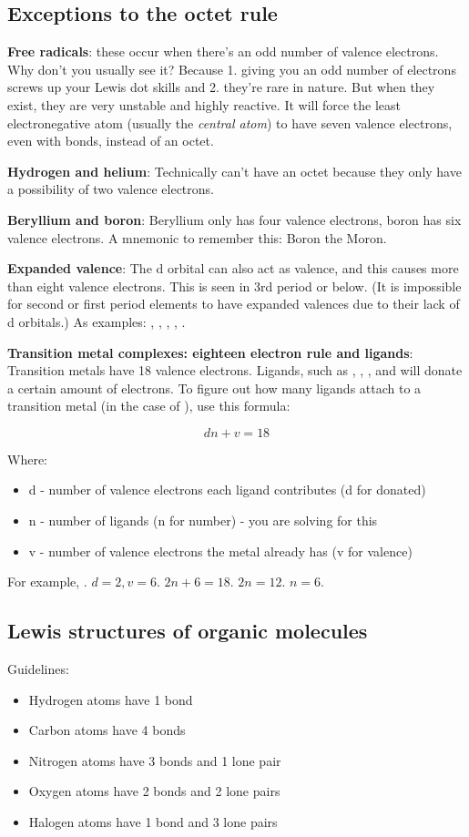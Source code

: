 \documentclass[letterpaper, 12pt]{article}
\begin{document}
	\subsection{Exceptions to the octet rule}
	\textbf{Free radicals}: these occur when there's an odd number of valence electrons. Why don't you usually see it? Because 1. giving you an odd number of electrons screws up your Lewis dot skills and 2. they're rare in nature. But when they exist, they are very unstable and highly reactive. It will force the least electronegative atom (usually the \textit{central atom}) to have seven valence electrons, even with bonds, instead of an octet.
	
	\textbf{Hydrogen and helium}: Technically can't have an octet because they only have a possibility of two valence electrons.
	
	\textbf{Beryllium and boron}: Beryllium only has four valence electrons, boron has six valence electrons. A mnemonic to remember this: Boron the Moron.
	
	\textbf{Expanded valence}: The d orbital can also act as valence, and this causes more than eight valence electrons. This is seen in 3rd period or below. (It is impossible for second or first period elements to have expanded valences due to their lack of d orbitals.) As examples: , , , , .
	
	\textbf{Transition metal complexes: eighteen electron rule and ligands}: Transition metals have 18 valence electrons. Ligands, such as , , , and  will donate a certain amount of electrons. To figure out how many ligands attach to a transition metal (in the case of ), use this formula:
	
	$$dn + v = 18$$
	
	Where:
	\begin{itemize}
		\item d - number of valence electrons each ligand contributes (d for donated)
		\item n - number of ligands (n for number) - you are solving for this
		\item v - number of valence electrons the metal already has (v for valence)
	\end{itemize}
	
	For example, . $d = 2, v = 6$. $2n + 6 = 18$. $2n = 12$. $n = 6$.
	
	\subsection{Lewis structures of organic molecules}
	Guidelines:
	\begin{itemize}
		\item Hydrogen atoms have 1 bond
		\item Carbon atoms have 4 bonds
		\item Nitrogen atoms have 3 bonds and 1  lone pair
		\item Oxygen atoms have 2 bonds and 2  lone pairs
		\item Halogen atoms have 1 bond and 3  lone pairs
	\end{itemize}
\clearpage
\end{document}
